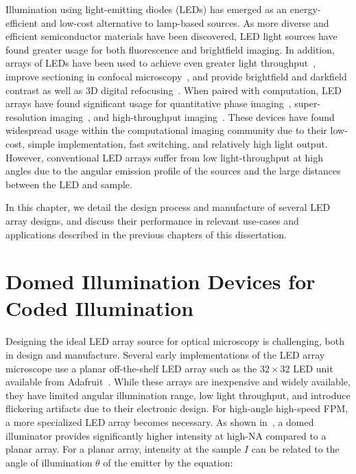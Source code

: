 Illumination using light-emitting diodes (LEDs) has emerged as an energy-efficient and low-cost alternative to lamp-based sources. As more diverse and efficient semiconductor materials have been discovered, LED light sources have found greater usage for both fluorescence and brightfield imaging. In addition, arrays of LEDs have been used to achieve even greater light throughput~\cite{albeanu2008led}, improve sectioning in confocal microscopy~\cite{poher2007optical}, and provide brightfield and darkfield contrast as well as 3D digital refocusing~\cite{Zheng2011}. When paired with computation, LED arrays have found significant usage for quantitative phase imaging~\cite{tian2015quantitative, phillips2015multi, chen2018quantitative}, super-resolution imaging~\cite{Zheng2013, Tian2014}, and high-throughput imaging~\cite{Ma:15}. These devices have found widespread usage within the computational imaging community due to their low-cost, simple implementation, fast switching, and relatively high light output. However, conventional LED arrays suffer from low light-throughput at high angles due to the angular emission profile of the sources and the large distances between the LED and sample.

In this chapter, we detail the design process and manufacture of several LED array designs, and discuss their performance in relevant use-cases and applications described in the previous chapters of this dissertation.

\section{Domed Illumination Devices for Coded Illumination}

Designing the ideal LED array source for optical microscopy is challenging, both in design and manufacture. Several early implementations of the LED array microscope use a planar off-the-shelf LED array such as the $32\times 32$ LED unit available from Adafruit~\cite{Zheng2013, Zheng2011}. While these arrays are inexpensive and widely available, they have limited angular illumination range, low light throughput, and introduce flickering artifacts due to their electronic design. For high-angle high-speed FPM, a more specialized LED array becomes necessary. As shown in~\cite{phillips2015multi, Dominguez:14}, a domed illuminator provides significantly higher intensity at high-NA compared to a planar array. For a planar array, intensity at the sample $I$ can be related to the angle of illumination $\theta$ of the emitter by the equation:

